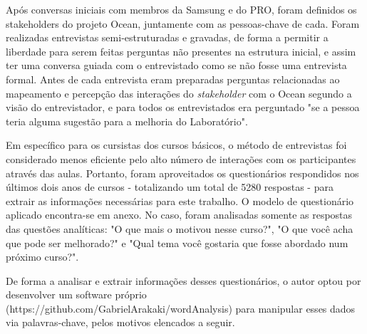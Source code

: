 Após conversas iniciais com membros da Samsung e do PRO, foram definidos os stakeholders do projeto Ocean, juntamente com as pessoas-chave de cada. Foram realizadas entrevistas semi-estruturadas e gravadas, de forma a permitir a liberdade para serem feitas perguntas não presentes na estrutura inicial, e assim ter uma conversa guiada com o entrevistado como se não fosse uma entrevista formal. Antes de cada entrevista eram preparadas perguntas relacionadas ao mapeamento e percepção das interações do \textit{stakeholder} com o Ocean segundo a visão do entrevistador, e para todos os entrevistados era perguntado "se a pessoa teria alguma sugestão para a melhoria do Laboratório".

Em específico para os cursistas dos cursos básicos, o método de entrevistas foi considerado menos eficiente pelo alto número de interações com os participantes através das aulas. Portanto, foram aproveitados os questionários respondidos nos últimos dois anos de cursos - totalizando um total de 5280 respostas - para extrair as informações necessárias para este trabalho. O modelo de questionário aplicado encontra-se em anexo. No caso, foram analisadas somente as respostas das questões analíticas: "O que mais o motivou nesse curso?", "O que você acha que pode ser melhorado?" e "Qual tema você gostaria que fosse abordado num próximo curso?".

De forma a analisar e extrair informações desses questionários, o autor optou por desenvolver um software próprio (https://github.com/GabrielArakaki/wordAnalysis) para manipular esses dados via palavras-chave, pelos motivos elencados a seguir.

